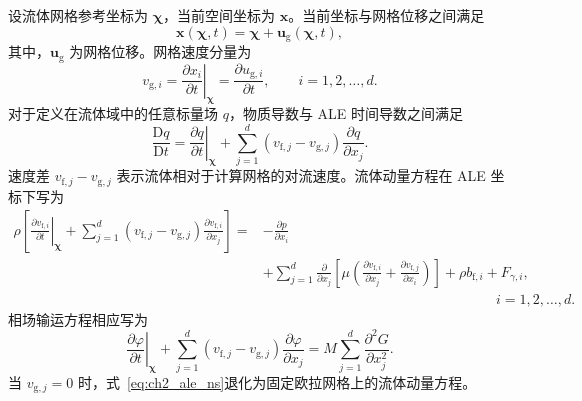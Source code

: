 设流体网格参考坐标为 $\boldsymbol{\chi}$，当前空间坐标为 $\boldsymbol{x}$。当前坐标与网格位移之间满足
\begin{equation}
\boldsymbol{x}(\boldsymbol{\chi},t)
=
\boldsymbol{\chi}
+
\boldsymbol{u}_{\mathrm g}(\boldsymbol{\chi},t),
\label{eq:ch2_ale_mapping}
\end{equation}
其中，$\boldsymbol{u}_{\mathrm g}$ 为网格位移。网格速度分量为
\begin{equation}
v_{\mathrm g,i}
=
\left.
\frac{\partial x_i}{\partial t}
\right|_{\boldsymbol{\chi}}
=
\frac{\partial u_{\mathrm g,i}}{\partial t},
\qquad i=1,2,\ldots,d.
\label{eq:ch2_mesh_velocity}
\end{equation}
对于定义在流体域中的任意标量场 $q$，物质导数与 ALE 时间导数之间满足
\begin{equation}
\frac{\mathrm Dq}{\mathrm Dt}
=
\left.
\frac{\partial q}{\partial t}
\right|_{\boldsymbol{\chi}}
+
\sum_{j=1}^{d}
\left(v_{\mathrm f,j}-v_{\mathrm g,j}\right)
\frac{\partial q}{\partial x_j}.
\label{eq:ch2_ale_derivative}
\end{equation}
速度差 $v_{\mathrm f,j}-v_{\mathrm g,j}$ 表示流体相对于计算网格的对流速度。流体动量方程在 ALE 坐标下写为
\begin{equation}
\begin{aligned}
\rho
\left[
\left.
\frac{\partial v_{\mathrm f,i}}{\partial t}
\right|_{\boldsymbol{\chi}}
+
\sum_{j=1}^{d}
\left(v_{\mathrm f,j}-v_{\mathrm g,j}\right)
\frac{\partial v_{\mathrm f,i}}{\partial x_j}
\right]
={}&
-\frac{\partial p}{\partial x_i}
\\
&+
\sum_{j=1}^{d}
\frac{\partial}{\partial x_j}
\left[
\mu
\left(
\frac{\partial v_{\mathrm f,i}}{\partial x_j}
+
\frac{\partial v_{\mathrm f,j}}{\partial x_i}
\right)
\right]
+
\rho b_{\mathrm f,i}
+
F_{\gamma,i},
\\
&\hspace{7cm}i=1,2,\ldots,d.
\end{aligned}
\label{eq:ch2_ale_ns}
\end{equation}
相场输运方程相应写为
\begin{equation}
\left.
\frac{\partial\varphi}{\partial t}
\right|_{\boldsymbol{\chi}}
+
\sum_{j=1}^{d}
\left(v_{\mathrm f,j}-v_{\mathrm g,j}\right)
\frac{\partial\varphi}{\partial x_j}
=
M
\sum_{j=1}^{d}
\frac{\partial^2G}{\partial x_j^2}.
\label{eq:ch2_ale_cahn_hilliard}
\end{equation}
当 $v_{\mathrm g,j}=0$ 时，式~\eqref{eq:ch2_ale_ns}退化为固定欧拉网格上的流体动量方程。

